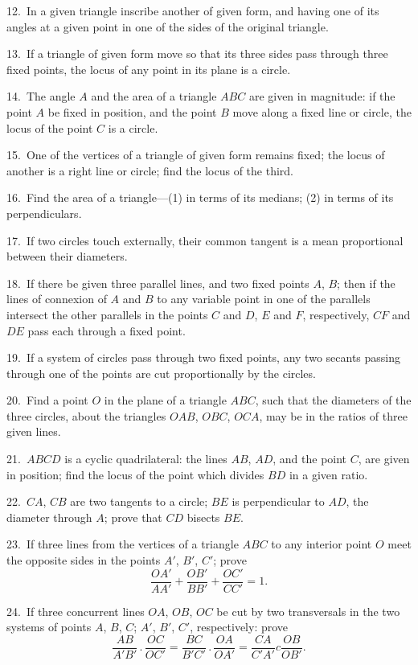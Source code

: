 \documentclass[oneside]{book}
\begin{document}
\begin{footnotesize}
12.~In a given triangle inscribe another of given form, and
having one of its angles at a given point in one of the sides of
the original triangle.

13.~If a triangle of given form move so that its three sides
pass through three fixed points, the locus of any point in its
plane is a circle.

14.~The angle $A$ and the area of a triangle $ABC$ are given in
magnitude: if the point $A$ be fixed in position, and the point $B$
move along a fixed line or circle, the locus of the point $C$ is a
circle.

15.~One of the vertices of a triangle of given form remains
fixed; the locus of another is a right line or circle; find the
locus of the third.

16.~Find the area of a triangle---(1) in terms of its medians;
(2) in terms of its perpendiculars.

17.~If two circles touch externally, their common tangent is a
mean proportional between their diameters.

18.~If there be given three parallel lines, and two fixed points
$A$, $B$; then if the lines of connexion of $A$ and $B$ to any variable
point in one of the parallels intersect the other parallels in the
points $C$ and $D$, $E$ and $F$, respectively, $CF$ and $DE$ pass each
through a fixed point.

19.~If a system of circles pass through two fixed points, any
two secants passing through one of the points are cut proportionally
by the circles.

20.~Find a point\label{poiat} $O$ in the plane of a triangle $ABC$, such that
the diameters of the three circles, about the triangles $OAB$, $OBC$,
$OCA$, may be in the ratios of three given lines.


21.~$ABCD$ is a cyclic quadrilateral: the lines $AB$, $AD$, and
the point $C$, are given in position; find the locus of the point
which divides $BD$ in a given ratio.

22.~$CA$, $CB$ are two tangents to a circle; $BE$ is perpendicular
to $AD$, the diameter through $A$; prove that $CD$ bisects $BE$.

23.~If three lines from the vertices of a triangle $ABC$ to any
interior point $O$ meet the opposite sides in the points $A'$, $B'$, $C'$;
prove
\[
   \frac{OA'}{AA'} + \frac{OB'}{BB'} + \frac{OC'}{CC'} = 1.
\]

24.~If three concurrent lines $OA$, $OB$, $OC$ be cut by two
transversals in the two systems of points $A$, $B$, $C$; $A'$, $B'$, $C'$,
respectively: prove
\[
  \frac{AB}{A'B'} \,.\, \frac{OC}{OC'}
= \frac{BC}{B'C'} \,.\, \frac{OA}{OA'}
= \frac{CA}{C'A'} c \frac{OB}{OB'}.
\]


\end{footnotesize}
\end{document}
